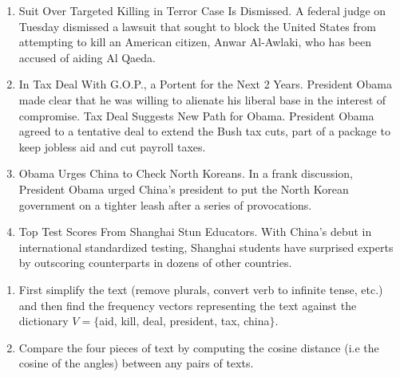 \documentclass[11pt]{article}
\begin{document}
\begin{enumerate}[label=(\alph*)]
    \item Suit Over Targeted Killing in Terror Case Is Dismissed. A federal judge on Tuesday dismissed a lawsuit that sought to block the United States from attempting to kill an American citizen, Anwar Al-Awlaki, who has been accused of aiding Al Qaeda.

    \item In Tax Deal With G.O.P., a Portent for the Next 2 Years. President Obama made clear that he was willing to alienate his liberal base in the interest of compromise. Tax Deal Suggests New Path for Obama. President Obama agreed to a tentative deal to extend the Bush tax cuts, part of a package to keep jobless aid and cut payroll taxes.

    \item Obama Urges China to Check North Koreans. In a frank discussion, President Obama urged China's president to put the North Korean government on a tighter leash after a series of provocations.

    \item Top Test Scores From Shanghai Stun Educators. With China's debut in international standardized testing, Shanghai students have surprised experts by outscoring counterparts in dozens of other countries.
\end{enumerate}

\begin{enumerate}
    \item
    First simplify the text (remove plurals, convert verb to infinite tense, etc.) and then find the frequency vectors   representing the text against the dictionary $V=\{$aid, kill, deal, president, tax, china$\}$.

    \item Compare the four pieces of text by computing the cosine distance (i.e the cosine of the angles) between any pairs of texts.
\end{enumerate}
\end{document}
